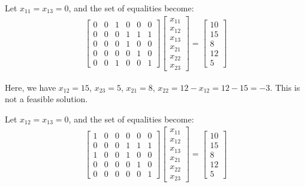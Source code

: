 \documentclass[letter,12pt]{article}
\begin{document}
Let $x_{11} = x_{13} = 0$, and the set of equalities become:
\begin{eqnarray*}
\left[
\begin{array}{cccccc}
0 & 0 & 1 & 0 & 0 & 0 \\
0 & 0 & 0 & 1 & 1 & 1 \\
0 & 0 & 0 & 1 & 0 & 0 \\
0 & 0 & 0 & 0 & 1 & 0 \\
0 & 0 & 1 & 0 & 0 & 1
\end{array}
\right]
\left[
\begin{array}{cccccc}
x_{11} \\
x_{12} \\
x_{13} \\
x_{21} \\
x_{22} \\
x_{23}
\end{array}
\right]
=
\left[
\begin{array}{cccccc}
10 \\
15 \\
8 \\
12 \\
5
\end{array}
\right]
\end{eqnarray*}

Here, we have $x_{12} = 15$, $x_{23} = 5$, $x_{21} = 8$, $x_{22} = 12 - x_{12} = 12 - 15 = -3$. This is not a feasible solution.


Let $x_{12} = x_{13} = 0$, and the set of equalities become:
\begin{eqnarray*}
\left[
\begin{array}{cccccc}
1 & 0 & 0 & 0 & 0 & 0 \\
0 & 0 & 0 & 1 & 1 & 1 \\
1 & 0 & 0 & 1 & 0 & 0 \\
0 & 0 & 0 & 0 & 1 & 0 \\
0 & 0 & 0 & 0 & 0 & 1
\end{array}
\right]
\left[
\begin{array}{cccccc}
x_{11} \\
x_{12} \\
x_{13} \\
x_{21} \\
x_{22} \\
x_{23}
\end{array}
\right]
=
\left[
\begin{array}{cccccc}
10 \\
15 \\
8 \\
12 \\
5
\end{array}
\right]\end{eqnarray*}
\end{document}
